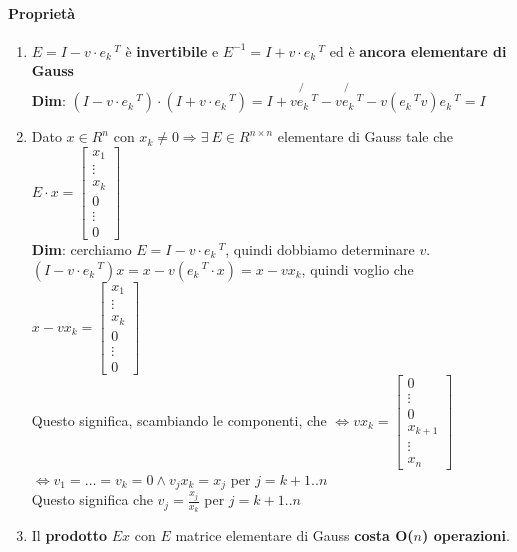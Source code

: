 \documentclass[10pt]{book}
\begin{document}
\paragraph{Proprietà}
\begin{enumerate}
	\item $E = I - v\cdot e_k\,^T$ è \textbf{invertibile} e $E^{-1} = I + v\cdot e_k\,^T$ ed è \textbf{ancora elementare di Gauss}\\
	\textbf{Dim}: $(I - v\cdot e_k\,^T)\cdot(I + v\cdot e_k\,^T) = I + \not{v e_k\,^T} - \not{v e_k\,^T} - v(e_k\,^T v)e_k\,^T = I$
	\item Dato $x \in R^n$ con $x_k \neq 0 \Rightarrow \exists\: E \in R^{n \times n}$ elementare di Gauss tale che
	\begin{math}
		E\cdot x = \left[ \begin{array}{c}
		x_1\\\vdots\\x_k\\0\\\vdots\\0
		\end{array} \right]	
	\end{math}\\
	\textbf{Dim}: cerchiamo $E = I - v\cdot e_k\,^T$, quindi dobbiamo determinare $v$.\\
	$(I - v\cdot e_k\,^T)x = x - v(e_k\,^T\cdot x) = x - v x_k$, quindi voglio che $x - v x_k = \left[ \begin{array}{c}
	x_1\\\vdots\\x_k\\0\\\vdots\\0
\end{array} \right]$\\
	Questo significa, scambiando le componenti, che $\Leftrightarrow v x_k = \left[ \begin{array}{c}
	0\\\vdots\\0\\x_{k+1}\\\vdots\\x_n
\end{array} \right]$\\
	$\Leftrightarrow v_1 = \ldots = v_k = 0 \wedge v_j x_k = x_j$ per $j = k+1..n$\\
	 Questo significa che $v_j = \frac{x_j}{x_k}$ per $j = k+1..n$
	 \item Il \textbf{prodotto} $E x$ con $E$ matrice elementare di Gauss \textbf{costa O($n$) operazioni}.\\

\end{enumerate}
\end{document}
